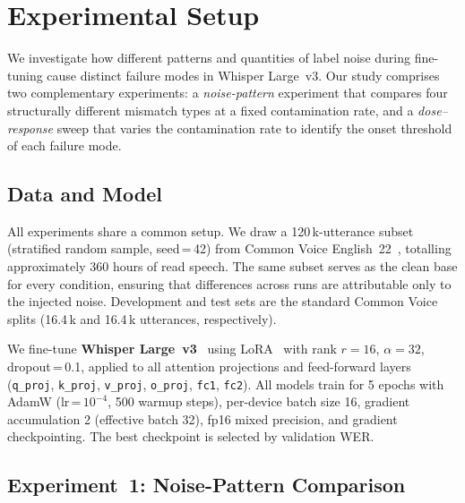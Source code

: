 
\section{Experimental Setup}
\label{sec:experiments}

We investigate how different patterns and quantities of label noise during
fine-tuning cause distinct failure modes in Whisper Large~v3.
Our study comprises two complementary experiments: a \emph{noise-pattern}
experiment that compares four structurally different mismatch types at a fixed
contamination rate, and a \emph{dose--response} sweep that varies the
contamination rate to identify the onset threshold of each failure mode.

\subsection{Data and Model}
\label{sec:data}

All experiments share a common setup.
We draw a 120\,k-utterance subset (stratified random sample, seed\,=\,42)
from Common Voice English~22~\cite{commonvoice}, totalling approximately
360 hours of read speech.
The same subset serves as the clean base for every condition, ensuring that
differences across runs are attributable only to the injected noise.
Development and test sets are the standard Common Voice splits (16.4\,k and
16.4\,k utterances, respectively).

We fine-tune \textbf{Whisper Large~v3}~\cite{radford2023robust} using
LoRA~\cite{hu2022lora} with rank $r{=}16$, $\alpha{=}32$,
dropout\,=\,0.1, applied to all attention projections and feed-forward
layers (\texttt{q\_proj}, \texttt{k\_proj}, \texttt{v\_proj},
\texttt{o\_proj}, \texttt{fc1}, \texttt{fc2}).
All models train for 5 epochs with AdamW (lr\,=\,$10^{-4}$,
500 warmup steps), per-device batch size 16, gradient accumulation 2
(effective batch 32), fp16 mixed precision, and gradient checkpointing.
The best checkpoint is selected by validation WER.

\subsection{Experiment~1: Noise-Pattern Comparison}
\label{sec:exp1}

